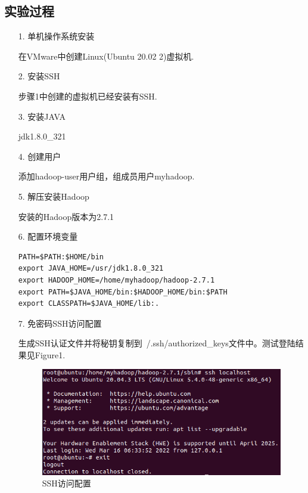 \documentclass[a4paper,UTF8]{article}
\theoremstyle{definition}
\begin{document}
\begin{CJK}{UTF8}{gkai}
\begin{CJK*}{UTF8}{gbsn}
\section*{实验过程}
\end{CJK*}
\begin{enumerate}
	\item[1.] 单机操作系统安装\\
	\par 在VMware中创建Linux(Ubuntu 20.02 2)虚拟机.
	\item[2.] 安装SSH\\
	\par 步骤1中创建的虚拟机已经安装有SSH.
	\item[3.] 安装JAVA\\
	\par jdk1.8.0\_321
	\item[4.] 创建用户
	\par 添加hadoop-user用户组，组成员用户myhadoop.\\
	\item[5.] 解压安装Hadoop
	\par 安装的Hadoop版本为2.7.1
	\item[6.] 配置环境变量
\begin{lstlisting}[escapeinside=``]
PATH=$PATH:$HOME/bin 
export JAVA_HOME=/usr/jdk1.8.0_321
export HADOOP_HOME=/home/myhadoop/hadoop-2.7.1 
export PATH=$JAVA_HOME/bin:$HADOOP_HOME/bin:$PATH 
export CLASSPATH=$JAVA_HOME/lib:.
\end{lstlisting}
	\item[7.] 免密码SSH访问配置
	\par 生成SSH认证文件并将秘钥复制到~/.ssh/authorized\_keys文件中。测试登陆结果见Figure1.
	\begin{figure}[h]
    \centering
    \includegraphics{./ssh.png}
    \caption{SSH访问配置}
    \end{figure} 
	

\end{enumerate}
\end{CJK}
\end{document}
